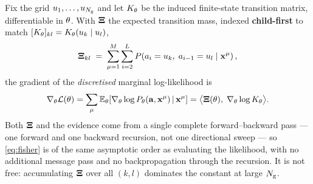 
\begin{proposition}
\label{prop:fisher}
Fix the grid $u_{1},\dots,u_{N_{\mathrm{g}}}$ and let $K_{\theta}$ be the induced finite-state
transition matrix, differentiable in $\theta$. With $\mathbf{\Xi}$ the expected transition mass,
indexed \textbf{child-first} to match
$[K_{\theta}]_{kl} = K_\theta(u_{k}\mid u_{l})$,
\begin{equation}
\label{eq:xi}
\mathbf{\Xi}_{kl} \;=\; \sum_{\mu=1}^{M}\sum_{i=2}^{L}
P\!\left(a_i=u_{k},\; a_{i-1}=u_{l} \;\middle|\; \mathbf{x}^\mu\right),
\end{equation}
the gradient of the \emph{discretised} marginal log-likelihood is
\begin{equation}
\label{eq:fisher}
\nabla_\theta \mathcal{L}(\theta)
= \sum_{\mu}\mathbb{E}_\theta\!\left[\nabla_\theta \log P_\theta(\mathbf{a},\mathbf{x}^\mu)\,\middle|\,\mathbf{x}^\mu\right]
= \big\langle \mathbf{\Xi}(\theta),\; \nabla_\theta \log K_{\theta} \big\rangle .
\end{equation}
Both $\mathbf{\Xi}$ and the evidence come from a single complete forward--backward pass --- one forward and
one backward recursion, not one directional sweep --- so \eqref{eq:fisher} is of the same
asymptotic order as evaluating the likelihood, with no additional message pass and no
backpropagation through the recursion. It is not free: accumulating $\mathbf{\Xi}$ over all $(k,l)$
dominates the constant at large $N_{\mathrm{g}}$.
\end{proposition}
